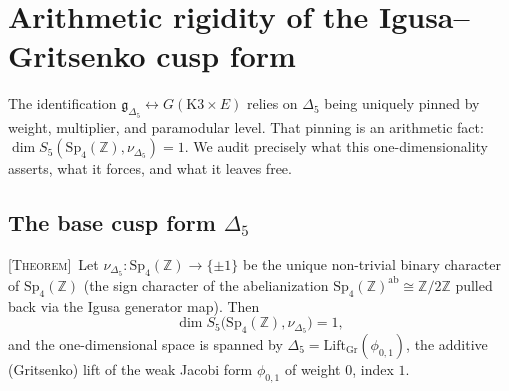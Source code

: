 %
%

\providecommand{\Sp}{\mathrm{Sp}}
\providecommand{\Z}{\mathbb{Z}}
\providecommand{\Q}{\mathbb{Q}}
\providecommand{\R}{\mathbb{R}}
\providecommand{\C}{\mathbb{C}}
\providecommand{\bH}{\mathbb{H}}
\providecommand{\cH}{\mathcal{H}}
\providecommand{\fg}{\mathfrak{g}}
\providecommand{\kBKM}{\kappa_{\mathrm{BKM}}}
\providecommand{\kch}{\kappa_{\mathrm{ch}}}
\providecommand{\ClaimStatusTheorem}{\textsc{[Theorem]}}
\providecommand{\ClaimStatusConjectured}{\textsc{[Conjectured]}}
\providecommand{\ClaimStatusAxiomatic}{\textsc{[Axiomatic]}}

\section{Arithmetic rigidity of the Igusa--Gritsenko cusp form}
\label{sec:arithmetic-rigidity-dim-S5}

The identification $\fg_{\Delta_5} \leftrightarrow G(\mathrm{K}3\times E)$
relies on $\Delta_5$ being uniquely pinned by weight, multiplier, and
paramodular level. That pinning is an arithmetic fact: $\dim
S_5(\Sp_4(\Z),\nu_{\Delta_5})=1$. We audit precisely what this
one-dimensionality asserts, what it forces, and what it leaves free.

\subsection{The base cusp form $\Delta_5$}
\label{subsec:delta5-dim}

\begin{theorem}
\label{thm:dim-S5-one}
\ClaimStatusTheorem\ Let $\nu_{\Delta_5}\colon \Sp_4(\Z)\to\{\pm 1\}$ be
the unique non-trivial binary character of $\Sp_4(\Z)$ (the sign
character of the abelianization $\Sp_4(\Z)^{\mathrm{ab}}\cong\Z/2\Z$
pulled back via the Igusa generator map). Then
\[
   \dim S_5\bigl(\Sp_4(\Z),\nu_{\Delta_5}\bigr)=1,
\]
and the one-dimensional space is spanned by
$\Delta_5=\mathrm{Lift}_{\mathrm{Gr}}(\phi_{0,1})$, the additive
(Gritsenko) lift of the weak Jacobi form $\phi_{0,1}$ of weight $0$,
index $1$.
\end{theorem}

